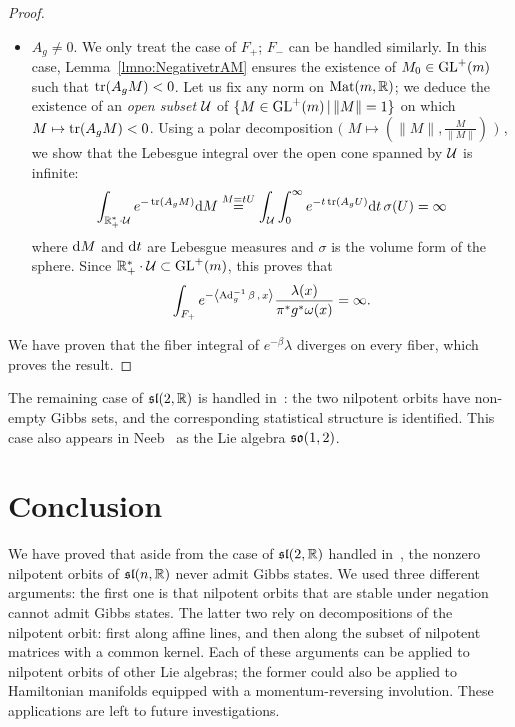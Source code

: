 \documentclass[english]{article}
\begin{document}
\begin{proof}
\begin{itemize}
	\item $A_g\neq 0$. We only treat the case of $F_+$; $F_-$ can be handled similarly.
	In this case, Lemma~\ref{lmno:NegativetrAM} ensures the existence of $M_0\in \operatorname{GL}^+(m)$ such that $\operatorname{tr}(A_gM)<0$. Let us fix any norm on $\operatorname{Mat}(m, \mathbb{R})$; we deduce the existence of an \emph{open subset} $\operatorname{{\mathcal{U}}}$ of $\{ M \in \operatorname{GL}^+(m) \, | \, \lVert M \rVert = 1\}$ on which $M\mapsto \operatorname{tr}(A_g M) <0$. 
    Using a polar decomposition 
    $\Big($
    $M \mapsto \left( \lVert M \rVert, \frac{M}{\lVert M \rVert} \right)$
    $\Big)$%
    , we show that the Lebesgue integral over the open cone spanned by $\operatorname{{\mathcal{U}}}$ is infinite:
	\[
		\int_{\mathbb{R}^*_+  \cdot \operatorname{{\mathcal{U}}}} e^{-\operatorname{tr}(A_g M)} {\operatorname d} M
		\stackrel{M=t U}{=}
		\int_{\operatorname{{\mathcal{U}}}} \int_0^\infty e^{-t \operatorname{tr}(A_g U)} {\operatorname d} t \, \sigma(U)
		= \infty
	\]
	where ${\operatorname d} M$ and ${\operatorname d} t$ are Lebesgue measures and $\sigma$ is the volume form of the sphere.
    Since $\mathbb{R}^*_+ \cdot \operatorname{{\mathcal{U}}} \subset \operatorname{GL}^+(m)$, 
    this proves that 
	\[
		\int_{F_+} 	e^{-\left\langle \operatorname{Ad}_g^{-1}\beta \,,\, x \right\rangle} 
				\frac{\lambda(x)}{\pi^*g^*\omega(x)}
		= \infty
	.\]
	\end{itemize}
	
	We have proven that the fiber integral of $e^{-\beta} \lambda$ diverges on every fiber, which proves the result.
\end{proof}

The remaining case of $\mathfrak{sl}(2, \mathbb{R})$ is handled in~\cite{NilpotentOrbitsGSI23}: the two nilpotent orbits have non-empty Gibbs sets, and the corresponding statistical structure is identified.
This case also appears in Neeb~\cite{NeebGibbsEnsembles} as the Lie algebra $\operatorname{\mathfrak{so}}(1,2)$.


\section{Conclusion}
%
We have proved that aside from the case of $\mathfrak{sl}(2, \mathbb{R})$ handled in~\cite{NilpotentOrbitsGSI23}, the nonzero nilpotent orbits of $\mathfrak{sl}(n, \mathbb{R})$ never admit Gibbs states.
We used three different arguments: the first one is that nilpotent orbits that are stable under negation cannot admit Gibbs states. The latter two rely on decompositions of the nilpotent orbit: first along affine lines, and then along the subset of nilpotent matrices with a common kernel.
Each of these arguments can be applied to nilpotent orbits of other Lie algebras; the former could also be applied to Hamiltonian manifolds equipped with a momentum-reversing involution.
These applications are left to future investigations.
\end{document}
